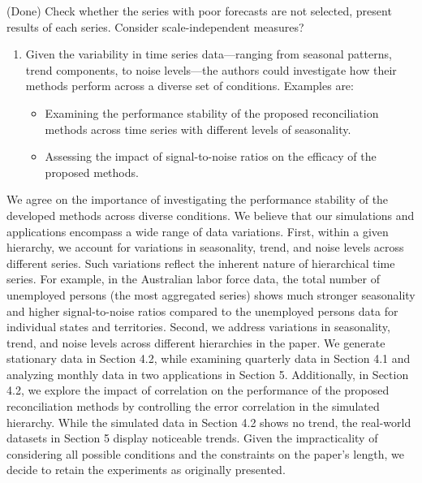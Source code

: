 \documentclass[11pt,a4paper,]{article}
\providecommand{\tightlist}{%
  \setlength{\itemsep}{0pt}\setlength{\parskip}{0pt}}
\renewenvironment{quote}
               {\list{}{\rightmargin\leftmargin}%
                \item\relax\color[RGB]{0,150,0}}
               {\endlist}
\begin{document}
\begin{quote}
(Done) Check whether the series with poor forecasts are not selected,
present results of each series. Consider scale-independent measures?
\end{quote}

\begin{enumerate}
\def\labelenumi{\arabic{enumi}.}
\setcounter{enumi}{4}
\tightlist
\item
  Given the variability in time series data---ranging from seasonal
  patterns, trend components, to noise levels---the authors could
  investigate how their methods perform across a diverse set of
  conditions. Examples are:

  \begin{itemize}
  \tightlist
  \item
    Examining the performance stability of the proposed reconciliation
    methods across time series with different levels of seasonality.
  \item
    Assessing the impact of signal-to-noise ratios on the efficacy of
    the proposed methods.
  \end{itemize}
\end{enumerate}

\begin{quote}
We agree on the importance of investigating the performance stability of
the developed methods across diverse conditions. We believe that our
simulations and applications encompass a wide range of data variations.
First, within a given hierarchy, we account for variations in
seasonality, trend, and noise levels across different series. Such
variations reflect the inherent nature of hierarchical time series. For
example, in the Australian labor force data, the total number of
unemployed persons (the most aggregated series) shows much stronger
seasonality and higher signal-to-noise ratios compared to the unemployed
persons data for individual states and territories. Second, we address
variations in seasonality, trend, and noise levels across different
hierarchies in the paper. We generate stationary data in Section 4.2,
while examining quarterly data in Section 4.1 and analyzing monthly data
in two applications in Section 5. Additionally, in Section 4.2, we
explore the impact of correlation on the performance of the proposed
reconciliation methods by controlling the error correlation in the
simulated hierarchy. While the simulated data in Section 4.2 shows no
trend, the real-world datasets in Section 5 display noticeable trends.
Given the impracticality of considering all possible conditions and the
constraints on the paper's length, we decide to retain the experiments
as originally presented.
\end{quote}
\end{document}
